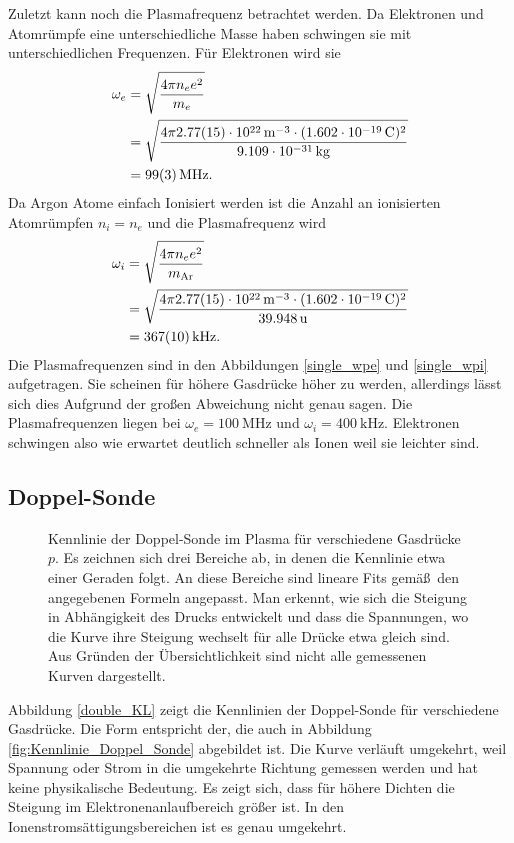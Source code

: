 Zuletzt kann noch die Plasmafrequenz betrachtet werden.
Da Elektronen und Atomr\"umpfe eine unterschiedliche Masse haben schwingen sie mit unterschiedlichen Frequenzen.
F\"ur Elektronen wird sie
\begin{align}
\omega_e
    &=\sqrt{\frac{4\pi n_e e^2}{m_e}}
    \label{swpe}\\
    &=\sqrt{\frac{4\pi \siAnea \cdot(\sie)^2}{\sime}}\nonumber\\
    &=\siAwpea .\nonumber
\end{align}
Da Argon Atome einfach Ionisiert werden ist die Anzahl an ionisierten Atomr\"umpfen $n_i=n_e$ und die Plasmafrequenz wird
\begin{align}
\omega_i
    &=\sqrt{\frac{4\pi n_e e^2}{m_\text{Ar}}}
    \label{swpe}\\
    &=\sqrt{\frac{4\pi \siAnea \cdot(\sie)^2}{\simAr}}\nonumber\\
    &=\siAwpia .\nonumber
\end{align}
Die Plasmafrequenzen sind in den Abbildungen \vref{single_wpe} und \vref{single_wpi} aufgetragen.
Sie scheinen f\"ur h\"ohere Gasdr\"ucke h\"oher zu werden, allerdings l\"asst sich dies Aufgrund der gro\ss en Abweichung nicht genau sagen.
Die Plasmafrequenzen liegen bei $\omega_e=\SI{100}{\mega\hertz}$ und $\omega_i=\SI{400}{\kilo\hertz}$.
Elektronen schwingen also wie erwartet deutlich schneller als Ionen weil sie leichter sind.

\FloatBarrier
\subsection{Doppel-Sonde}\label{double}
\begin{figure}[htbp]
    \centering
    
    \caption{
        Kennlinie der Doppel-Sonde im Plasma f\"ur verschiedene Gasdr\"ucke $p$.
        Es zeichnen sich drei Bereiche ab, in denen die Kennlinie etwa einer Geraden folgt.
        An diese Bereiche sind lineare Fits gem\"a\ss\ den angegebenen Formeln angepasst.
        Man erkennt, wie sich die Steigung in Abh\"angigkeit des Drucks entwickelt und dass die Spannungen, wo die Kurve ihre Steigung wechselt f\"ur alle Dr\"ucke etwa gleich sind.
        Aus Gr\"unden der \"Ubersichtlichkeit sind nicht alle gemessenen Kurven dargestellt.
    }
    \label{double_KL}
\end{figure}

Abbildung \vref{double_KL} zeigt die Kennlinien der Doppel-Sonde f\"ur verschiedene Gasdr\"ucke.
Die Form entspricht der, die auch in Abbildung \vref{fig:Kennlinie_Doppel_Sonde} abgebildet ist.
Die Kurve verl\"auft umgekehrt, weil Spannung oder Strom in die umgekehrte Richtung gemessen werden und hat keine physikalische Bedeutung.
Es zeigt sich, dass f\"ur h\"ohere Dichten die Steigung im Elektronenanlaufbereich gr\"o\ss er ist.
In den Ionenstroms\"attigungsbereichen ist es genau umgekehrt.

